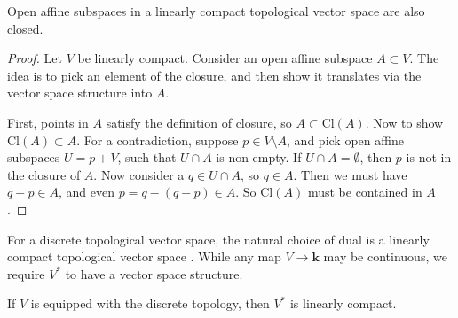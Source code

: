         
        \begin{lem} Open affine subspaces in a linearly compact topological vector space are also closed.
        \end{lem}
        \begin{proof}
        Let \(V\) be linearly compact. Consider an open affine subspace \(A  \subset V\).  The idea is to pick an element of the closure, and then show it translates via the vector space structure into \(A\).
        
        First, points in \(A\) satisfy the definition of closure, so \( A \subset \mathrm{Cl}(A)\). Now to show \( \mathrm{Cl}(A) \subset A\). For a contradiction, suppose \( p \in V \setminus A\), and pick open affine subspaces \(U = p + V\), such that \( U \cap A\) is non empty. If \( U \cap A = \emptyset\), then \( p \) is not in the closure of \(A\).  Now consider a \(q \in  U \cap A\), so \( q \in A \). Then we must have \( q - p \in A\), and even \( p= q-(q-p) \in A\). So \( \mathrm{Cl}(A)\) must be contained in \(A\).  
        \end{proof}
        
        
        \iffalse 
        In finite dimensions, discrete topological vector spaces are also linearly compact. 
    
        \begin{lem} If \(V\) is linearly compact and \( \dim(V)\) is finite, then \(V\) is discrete.
        \end{lem}
        \begin{proof}
        Necessarily have to show that the neighbourhood basis is given by just the points themselves \(p + \{0\} = p\).
        
        So we need to show the neighbourhood basis of \(0\) is simply the zero vector space \( \{0\}\).
        
    
        \end{proof}
        \fi 
    
        For a discrete topological vector space, the natural choice of dual is a linearly compact topological vector space \cite{leinster}. While any map \(V \rightarrow \mathbf{k}\) may be continuous, we require \( V^*\) to have a vector space structure.

        \begin{lem}
        \label{lem:compact}
        If \(V\) is equipped with the discrete topology, then \(V^*\) is linearly compact.
        \end{lem}

